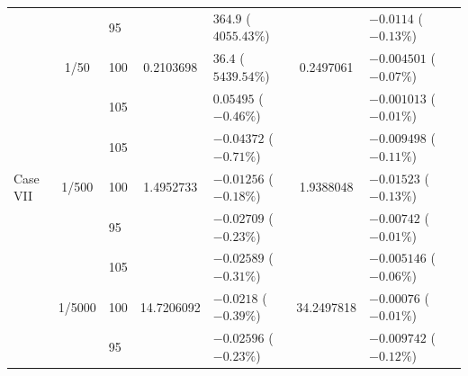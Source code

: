 \begin{table}[htbp]
{\begin{tabular}{lclclclc}
    \midrule
    \multirow{9}{*}{Case VII}
    & \multirow{3}{*}{1/50}  & 95  & \multirow{3}{*}{0.2103698} & $364.9$ ($4055.43\%$)   & \multirow{3}{*}{0.2497061} & $-0.0114$ ($-0.13\%$)     \\
    &                         & 100 &                           & $36.4$ ($5439.54\%$)     &                           & $-0.004501$ ($-0.07\%$)   \\
    &                         & 105 &                           & $0.05495$ ($-0.46\%$)    &                           & $-0.001013$ ($-0.01\%$)   \\
    \cmidrule(lr){2-7}
    & \multirow{3}{*}{1/500} & 105 & \multirow{3}{*}{1.4952733} & $-0.04372$ ($-0.71\%$)  & \multirow{3}{*}{1.9388048} & $-0.009498$ ($-0.11\%$)   \\
    &                         & 100 &                           & $-0.01256$ ($-0.18\%$)   &                           & $-0.01523$ ($-0.13\%$)    \\
    &                         & 95  &                           & $-0.02709$ ($-0.23\%$)   &                           & $-0.00742$ ($-0.01\%$)    \\
    \cmidrule(lr){2-7}
    & \multirow{3}{*}{1/5000}& 105 & \multirow{3}{*}{14.7206092}& $-0.02589$ ($-0.31\%$)  & \multirow{3}{*}{34.2497818}& $-0.005146$ ($-0.06\%$)   \\
    &                         & 100 &                           & $-0.0218$ ($-0.39\%$)    &                           & $-0.00076$ ($-0.01\%$)    \\
    &                         & 95  &                           & $-0.02596$ ($-0.23\%$)   &                           & $-0.009742$ ($-0.12\%$)   \\
    \bottomrule
  \end{tabular}%
  }
\end{table}
